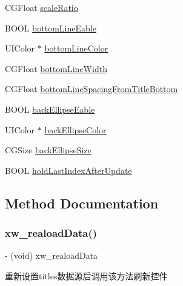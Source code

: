 \begin{DoxyCompactItemize}
C\+G\+Float \mbox{\hyperlink{interface_x_w_catergory_view_a285e0b1598b981711696ba3712c7dc0e}{scale\+Ratio}}
\item 
B\+O\+OL \mbox{\hyperlink{interface_x_w_catergory_view_a0c7243c41c7f15a2754bee2243d671c0}{bottom\+Line\+Eable}}
\item 
U\+I\+Color $\ast$ \mbox{\hyperlink{interface_x_w_catergory_view_a317d1d3fbb7e6cf14b35623ae89f4945}{bottom\+Line\+Color}}
\item 
C\+G\+Float \mbox{\hyperlink{interface_x_w_catergory_view_aff4c92e040c5b1e683688523e8f35df8}{bottom\+Line\+Width}}
\item 
C\+G\+Float \mbox{\hyperlink{interface_x_w_catergory_view_ab37af2a526d83835cef33ee124e29e42}{bottom\+Line\+Spacing\+From\+Title\+Bottom}}
\item 
B\+O\+OL \mbox{\hyperlink{interface_x_w_catergory_view_a7189950ba87e5accedbcc6624aa539ff}{back\+Ellipse\+Eable}}
\item 
U\+I\+Color $\ast$ \mbox{\hyperlink{interface_x_w_catergory_view_a8e613a65272a9d51eeeb5effd89f5b1b}{back\+Ellipse\+Color}}
\item 
C\+G\+Size \mbox{\hyperlink{interface_x_w_catergory_view_a3291ea1213d15d1526951896ebb2278d}{back\+Ellipse\+Size}}
\item 
B\+O\+OL \mbox{\hyperlink{interface_x_w_catergory_view_ada4c7114db03f789408e79e1de0d4c36}{hold\+Last\+Index\+After\+Update}}
\end{DoxyCompactItemize}


\subsection{Method Documentation}
\mbox{\label{interface_x_w_catergory_view_a09242245705dc5666543cb6fcaf9f6be}} 
\subsubsection{\texorpdfstring{xw\+\_\+reaload\+Data()}{xw\_realoadData()}}
{\footnotesize\ttfamily -\/ (void) xw\+\_\+reaload\+Data \begin{DoxyParamCaption}{ }\end{DoxyParamCaption}}

重新设置titles数据源后调用该方法刷新控件 

